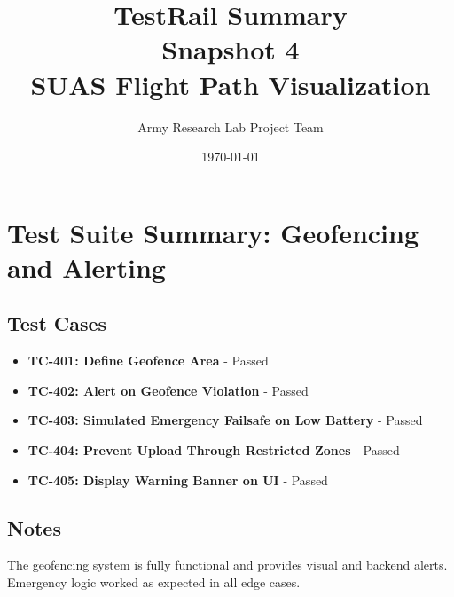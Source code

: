 \documentclass[12pt]{article}
\title{TestRail Summary\\Snapshot 4\\SUAS Flight Path Visualization}
\author{Army Research Lab Project Team}
\date{\today}
\begin{document}
\maketitle

\section*{Test Suite Summary: Geofencing and Alerting}

\subsection*{Test Cases}
\begin{itemize}
  \item \textbf{TC-401: Define Geofence Area} - Passed
  \item \textbf{TC-402: Alert on Geofence Violation} - Passed
  \item \textbf{TC-403: Simulated Emergency Failsafe on Low Battery} - Passed
  \item \textbf{TC-404: Prevent Upload Through Restricted Zones} - Passed
  \item \textbf{TC-405: Display Warning Banner on UI} - Passed
\end{itemize}

\subsection*{Notes}
The geofencing system is fully functional and provides visual and backend alerts. Emergency logic worked as expected in all edge cases.
\end{document}
